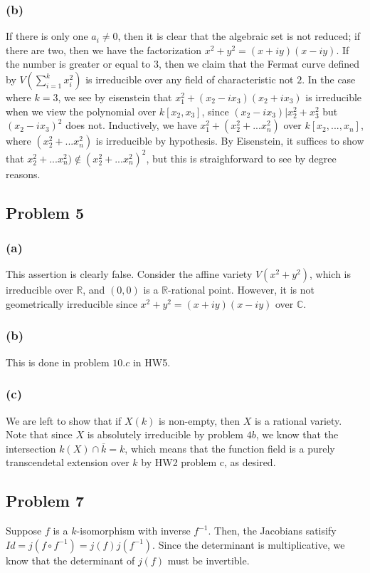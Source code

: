 \documentclass{article}
\theoremstyle{definition}
\theoremstyle{definition}
\theoremstyle{definition}
\theoremstyle{definition}
\theoremstyle{definition}
\theoremstyle{definition}
\theoremstyle{definition}
\begin{document}
\subsubsection*{(b)}
If there is only one $a_i\neq 0$, then it is clear that the algebraic set is not reduced; if there are two, then we have the factorization $x^2+y^2=(x+iy)(x-iy)$. If the number is greater or equal to $3$, then we claim that the Fermat curve defined by $V(\sum_{i=1}^{k}x_i^2)$ is irreducible over any field of characteristic not $2$. In the case where $k=3$, we see by eisenstein that $x_1^2+(x_2-ix_3)(x_2+ix_3)$ is irreducible when we view the polynomial over $k[x_2,x_3]$, since $(x_2-ix_3)|x_2^2+x_3^2$ but $(x_2-ix_3)^2$ does not. Inductively, we have $x_1^2+(x_2^2+...x_n^2)$ over $k[x_2,...,x_n]$, where $(x_2^2+...x_n^2)$ is irreducible by hypothesis. By Eisenstein, it suffices to show that $x_2^2+...x_n^2)\not \in (x_2^2+...x_n^2)^2$, but this is straighforward to see by degree reasons.

\subsection*{Problem 5}
\subsubsection*{(a)}
This assertion is clearly false. Consider the affine variety $V(x^2+y^2)$, which is irreducible over $\mathbb{R}$, and $(0,0)$ is a $\mathbb{R}$-rational point. However, it is not geometrically irreducible since $x^2+y^2=(x+iy)(x-iy)$ over $\mathbb{C}$.


\subsubsection*{(b)}
This is done in problem $10.c$ in HW5.

\subsubsection*{(c)}
We are left to show that if $X(k)$ is non-empty, then $X$ is a rational variety. Note that since $X$ is absolutely irreducible by problem $4b$, we know that the intersection $k(X)\cap \overline{k}=k$, which means that the function field is a purely transcendetal extension over $k$ by HW2 problem c, as desired.


\subsection*{Problem 7}
Suppose $f$ is a $k$-isomorphism with inverse $f^{-1}$. Then, the Jacobians satisify $Id=j(f\circ f^{-1})=j(f)j(f^{-1})$. Since the determinant is multiplicative, we know that the determinant of $j(f)$ must be invertible. 
\end{document}
